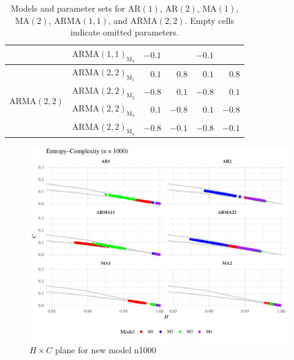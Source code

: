 \documentclass[11pt,a4paper]{article}
\begin{document}
\begin{table}[hbt]
\begin{tabular}{llrrrr}
		& $\mathrm{ARMA}(1,1)_{\textrm{M}_4}$ & $-0.1$ &     & $-0.1$ &      \\
		\midrule
		\multirow{4}[2]{*}{$\mathrm{ARMA}(2,2)$}  & $\mathrm{ARMA}(2,2)_{\textrm{M}_1}$ & $0.1$ & $0.8$  & $0.1$  & $0.8$  \\
		& $\mathrm{ARMA}(2,2)_{\textrm{M}_2}$ & $-0.8$ & $0.1$ & $-0.8$ & $0.1$  \\
		& $\mathrm{ARMA}(2,2)_{\textrm{M}_3}$ & $0.1$ & $-0.8$ & $0.1$  & $-0.8$ \\
		& $\mathrm{ARMA}(2,2)_{\textrm{M}_4}$ & $-0.8$ & $-0.1$ & $-0.8$ & $-0.1$ \\
		\bottomrule
	\end{tabular}
	\caption{Models and parameter sets for $\mathrm{AR}(1)$, $\mathrm{AR}(2)$, $\mathrm{MA}(1)$, $\mathrm{MA}(2)$, $\mathrm{ARMA}(1,1)$, and $\mathrm{ARMA}(2,2)$. Empty cells indicate omitted parameters.}
	\label{table:summary}
\end{table}


\begin{figure}[H]
	\includegraphics[width=0.8 \textwidth]{New_model_group_plot_n1000}
	\caption{$H \times C$ plane for new model n1000}
	\label{fig:HC new n1000}
\end{figure}
\end{document}

